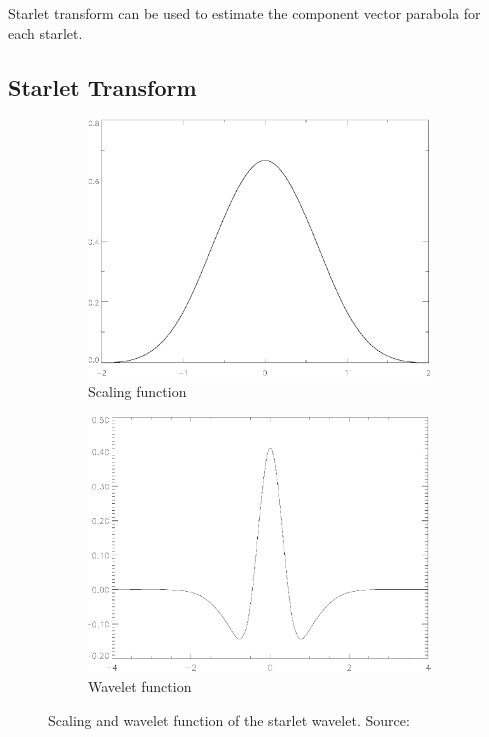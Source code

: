 Starlet transform can be used to estimate the component vector
parabola for each starlet.






\subsection{Starlet Transform} \label{cd:starlets}

\begin{figure}[h]
	\centering
	\begin{subfigure}[b]{0.4\linewidth}
		\includegraphics[width=\linewidth]{./chapters/05.algorithms/starlets/scaling.png}
		\caption{Scaling function}
		\label{cd:starlets:scaling}
	\end{subfigure}
	\begin{subfigure}[b]{0.4\linewidth}
		\includegraphics[width=\linewidth]{./chapters/05.algorithms/starlets/wavelet.png}
		\caption{Wavelet function}
		\label{cd:starlets:wavelet}
	\end{subfigure}
	\caption{Scaling and wavelet function of the starlet wavelet. Source: \cite{starck2015starlet}}
	\label{cd:starlets:figure}
\end{figure}


